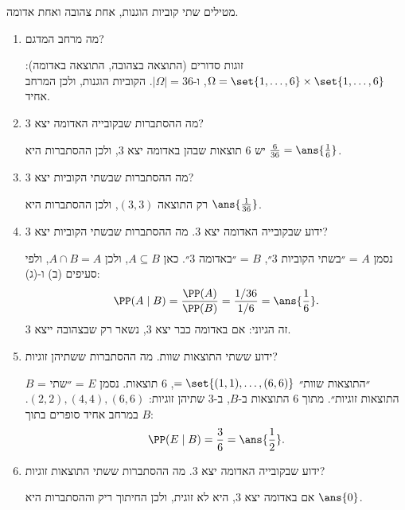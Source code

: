 מטילים שתי קוביות הוגנות, אחת צהובה ואחת אדומה.
\begin{enumerate}
\item מה מרחב המדגם?
\begin{solbox}
זוגות סדורים (התוצאה בצהובה, התוצאה באדומה): $\Omega=\set{1,\dots,6}\times\set{1,\dots,6}$, ו-$|\Omega|=36$. הקוביות הוגנות, ולכן המרחב אחיד.
\end{solbox}
\item מה ההסתברות שבקובייה האדומה יצא 3?
\begin{solbox}
יש 6 תוצאות שבהן באדומה יצא 3, ולכן ההסתברות היא $\frac6{36}=\ans{\frac16}$.
\end{solbox}
\item מה ההסתברות שבשתי הקוביות יצא 3?
\begin{solbox}
רק התוצאה $(3,3)$, ולכן ההסתברות היא $\ans{\frac1{36}}$.
\end{solbox}
\item ידוע שבקובייה האדומה יצא 3. מה ההסתברות שבשתי הקוביות יצא 3?
\begin{solbox}
נסמן $A$ = ״בשתי הקוביות 3״, $B$ = ״באדומה 3״. כאן $A\subseteq B$, ולכן $A\cap B=A$, ולפי סעיפים (ב) ו-(ג):
\[
\PP(A\mid B)=\frac{\PP(A)}{\PP(B)}=\frac{1/36}{1/6}=\ans{\frac16}.
\]
זה הגיוני: אם באדומה כבר יצא 3, נשאר רק שבצהובה ייצא 3.
\end{solbox}
\item ידוע ששתי התוצאות שוות. מה ההסתברות ששתיהן זוגיות?
\begin{solbox}
$B$ = ״התוצאות שוות״ $=\set{(1,1),\dots,(6,6)}$, 6 תוצאות. נסמן $E$ = ״שתי התוצאות זוגיות״. מתוך 6 התוצאות ב-$B$, ב-3 שתיהן זוגיות: $(2,2),(4,4),(6,6)$. במרחב אחיד סופרים בתוך $B$:
\[
\PP(E\mid B)=\frac36=\ans{\frac12}.
\]
\end{solbox}
\item ידוע שבקובייה האדומה יצא 3. מה ההסתברות ששתי התוצאות זוגיות?
\begin{solbox}
אם באדומה יצא 3, היא לא זוגית, ולכן החיתוך ריק וההסתברות היא $\ans{0}$.
\end{solbox}
\end{enumerate}
